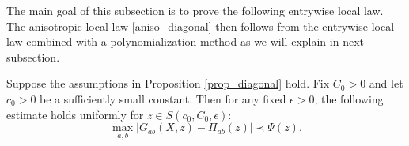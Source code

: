 The main goal of this subsection is to prove the following entrywise local law. The anisotropic local law \eqref{aniso_diagonal} then follows from the entrywise local law combined with a polynomialization method as we will explain in next subsection.

\begin{proposition}\label{prop_entry}
Suppose the assumptions in Proposition \ref{prop_diagonal} hold. Fix $C_0>0$ and let $c_0>0$ be a sufficiently small constant. Then for any fixed $\epsilon>0$, the following estimate holds uniformly for $z\in S(c_0,C_0,\epsilon)$: %
\begin{equation}\label{entry_diagonal}
\max_{a,b}\left| G_{ab}(X,z)  - \Pi_{ab} (z) \right| \prec \Psi(z).
\end{equation} 
\end{proposition}




